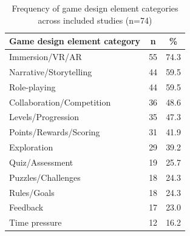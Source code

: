 \begin{table}[!h]
\centering
\caption{Frequency of game design element categories across included studies (n=74)}
\label{tab:game-elements}
\small
\begin{tabular}{lcc}
\hline
\textbf{Game design element category} & \textbf{n} & \textbf{\%} \\
\hline
Immersion/VR/AR & 55 & 74.3 \\
Narrative/Storytelling & 44 & 59.5 \\
Role-playing & 44 & 59.5 \\
Collaboration/Competition & 36 & 48.6 \\
Levels/Progression & 35 & 47.3 \\
Points/Rewards/Scoring & 31 & 41.9 \\
Exploration & 29 & 39.2 \\
Quiz/Assessment & 19 & 25.7 \\
Puzzles/Challenges & 18 & 24.3 \\
Rules/Goals & 18 & 24.3 \\
Feedback & 17 & 23.0 \\
Time pressure & 12 & 16.2 \\
\hline
\end{tabular}
\end{table}



